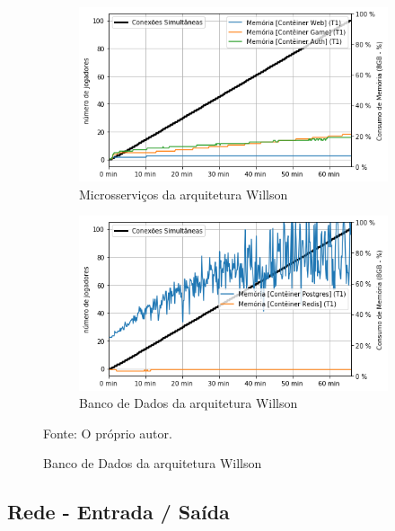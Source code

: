 \begin{figure}[htb!]
        \begin{subfigure}{.5\textwidth}
        \centering
        \includegraphics[width=.95\linewidth]{figuras/testes/w_mem_game.png}
        \caption{Microsserviços da arquitetura Willson}
        \label{fig:w_mem_game}
    \end{subfigure}%
    \begin{subfigure}{.5\textwidth}
        \centering
        \includegraphics[width=.95\linewidth]{figuras/testes/w_mem_db.png}
        \caption{Banco de Dados da arquitetura Willson}
        \label{fig:w_mem_db}
    \end{subfigure}%

    Fonte: O próprio autor.
\end{figure}

\subsection{Rede - Entrada / Saída}

